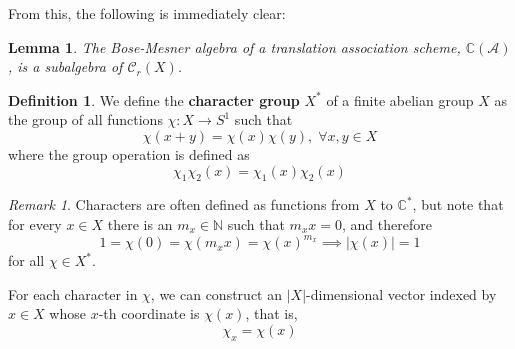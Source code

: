 \documentclass[a4paper,12pt]{article}
\theoremstyle{plain}
\newtheorem{lemma}[theorem]{Lemma}
\theoremstyle{definition}
\newtheorem{definition}[theorem]{Definition}
\theoremstyle{remark}
\newtheorem{remark}[theorem]{Remark}
\begin{document}
From this, the following is immediately clear:
\begin{lemma}
    The Bose-Mesner algebra of a translation
    association scheme, $ \mathbb{C}(\mathcal{A}) $, is a subalgebra of
    $ \mathcal{C}_r(X) $.
    \label{lm:bm_subalg}
\end{lemma}

\begin{definition}
    We define the \textbf{character group} $ X^* $ of a finite abelian group
    $ X $ as the group of all functions $ \chi : X \rightarrow S^1 $ such that
    \[ \chi(x+y) = \chi(x) \chi(y), \; \forall x,y \in X \]
    where the group operation is defined as
    \[ \chi_1\chi_2(x) = \chi_1(x)\chi_2(x) \]
\end{definition}
\begin{remark}
    Characters are often defined as functions from $ X $ to $ \mathbb{C}^* $,
    but note that for every $ x \in X $ there is an $ m_x \in \mathbb{N} $ such
    that $ m_xx = 0 $, and therefore
    \[
        1 = \chi(0) = \chi(m_xx) = \chi(x)^{m_x} \implies
        |\chi(x)| = 1
    \]
    for all $ \chi \in X^* $.
\end{remark}

For each character in $ \chi $, we can construct an $ |X| $-dimensional
vector indexed by $ x \in X $ whose $ x $-th coordinate is $ \chi(x) $,
that is,
\begin{equation}
    \chi_x = \chi(x)
\end{equation}
\end{document}
